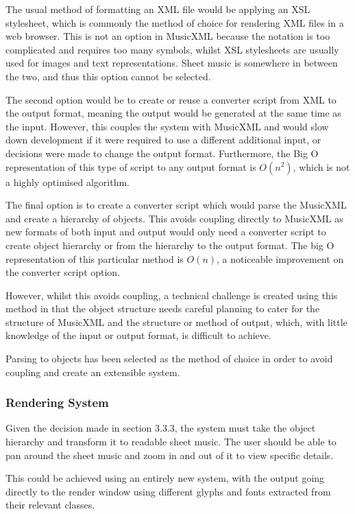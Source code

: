 The usual method of formatting an XML file would be applying an XSL stylesheet, which is commonly the method of choice for rendering XML files in a web browser. This is not an option in MusicXML because the notation is too complicated and requires too many symbols, whilst XSL stylesheets are usually used for images and text representations. Sheet music is somewhere in between the two, and thus this option cannot be selected.

The second option would be to create or reuse a converter script from XML to the output format, meaning the output would be generated at the same time as the input. However, this couples the system with MusicXML and would slow down development if it were required to use a different additional input, or decisions were made to change the output format. Furthermore, the Big O representation of this type of script to any output format is $O(n^2)$, which is not a highly optimised algorithm.

The final option is to create a converter script which would parse the MusicXML and create a hierarchy of objects. This avoids coupling directly to MusicXML as new formats of both input and output would only need a converter script to create object hierarchy or from the hierarchy to the output format. The big O representation of this particular method is $O(n)$, a noticeable improvement on the converter script option.

However, whilst this avoids coupling, a technical challenge is created using this method in that the object structure needs careful planning to cater for the structure of MusicXML and the structure or method of output, which, with little knowledge of the input or output format, is difficult to achieve.

Parsing to objects has been selected as the method of choice in order to avoid coupling and create an extensible system.

\subsubsection{Rendering System}
Given the decision made in section 3.3.3, the system must take the object hierarchy and transform it to readable sheet music. The user should be able to pan around the sheet music and zoom in and out of it to view specific details.

This could be achieved using an entirely new system, with the output going directly to the render window using different glyphs and fonts extracted from their relevant classes.


